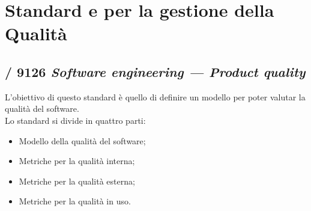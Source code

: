 \section{Standard e  per la gestione della Qualità}
  \subsection{/ 9126 \emph{Software engineering — Product quality}}
  L'obiettivo di questo standard è quello di definire un modello per poter valutar la qualità del software.\\
  Lo standard si divide in quattro parti:
  \begin{itemize}
    \item Modello della qualità del software;
    \item Metriche per la qualità interna;
    \item Metriche per la qualità esterna;
    \item Metriche per la qualità in uso.
  \end{itemize}
